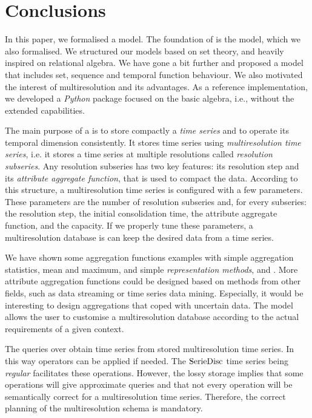 \section{Conclusions}
\label{sec:concl-future-work}

In this paper, we formalised a  model. The foundation of
 is the  model, which we also formalised.  We
structured our models based on set theory, and heavily inspired on
relational algebra. We have gone a bit further and proposed a
 model that includes set, sequence and temporal function
behaviour. We also motivated the interest of multiresolution and its
advantages.  As a reference implementation, we developed a
\emph{Python} package focused on the basic algebra, i.e., without the
extended  capabilities.


The main purpose of a  is to store compactly a \emph{time
  series} and to operate its temporal dimension consistently.  It
stores time series using \emph{multiresolution time series}, i.e. it
stores a time series at multiple resolutions called \emph{resolution
  subseries}. Any resolution subseries has two key features: its
resolution step and its \emph{attribute aggregate function}, that is
used to compact the data. According to this structure, a
multiresolution time series is configured with a few parameters. These
parameters are the number of resolution subseries and, for every
subseries: the resolution step, the initial consolidation time, the
attribute aggregate function, and the capacity.  If we properly tune
these parameters, a multiresolution database is can keep the desired
data from a time series.


We have shown some aggregation functions examples with simple
aggregation statistics, mean and maximum, and simple
\emph{representation methods}, \dd{} and \zohe{}. More attribute
aggregation functions could be designed based on methods from other
fields, such as data streaming or time series data mining. Especially,
it would be interesting to design aggregations that coped with
uncertain data.  The model allows the user to customise a
multiresolution database according to the actual requirements of a
given context.


The queries over  obtain time series from stored
multiresolution time series. In this way  operators can be
applied if needed. The $\operatorname{SerieDisc}$ time series being \emph{regular}
facilitates these operations. However, the lossy storage implies that
some operations will give approximate queries and that not
every operation will be semantically correct for a
multiresolution time series. Therefore, the correct planning of the
multiresolution schema is mandatory.


